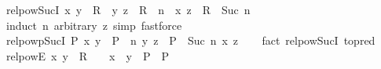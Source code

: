 \begin{isabellebody}
\endisatagproof
{\isafoldproof}%
%
\isadelimproof
\isanewline
%
\endisadelimproof
\isanewline
{}\isamarkupfalse%
\ relpow{\isacharunderscore}{\kern0pt}Suc{\isacharunderscore}{\kern0pt}I{}{\isacharcolon}{\kern0pt}\ {\isachardoublequoteopen}{\isacharparenleft}{\kern0pt}x{\isacharcomma}{\kern0pt}\ y{\isacharparenright}{\kern0pt}\ {\isasymin}\ R\ {\isasymLongrightarrow}\ {\isacharparenleft}{\kern0pt}y{\isacharcomma}{\kern0pt}\ z{\isacharparenright}{\kern0pt}\ {\isasymin}\ R\ {\isacharcircum}{\kern0pt}{\isacharcircum}{\kern0pt}\ n\ {\isasymLongrightarrow}\ {\isacharparenleft}{\kern0pt}x{\isacharcomma}{\kern0pt}\ z{\isacharparenright}{\kern0pt}\ {\isasymin}\ R\ {\isacharcircum}{\kern0pt}{\isacharcircum}{\kern0pt}\ Suc\ n{\isachardoublequoteclose}\isanewline
%
\isadelimproof
\ \ %
\endisadelimproof
%
\isatagproof
{}\isamarkupfalse%
\ {\isacharparenleft}{\kern0pt}induct\ n\ arbitrary{\isacharcolon}{\kern0pt}\ z{\isacharparenright}{\kern0pt}\ {\isacharparenleft}{\kern0pt}simp{\isacharcomma}{\kern0pt}\ fastforce{\isacharparenright}{\kern0pt}%
\endisatagproof
{\isafoldproof}%
%
\isadelimproof
\isanewline
%
\endisadelimproof
\isanewline
{}\isamarkupfalse%
\ relpowp{\isacharunderscore}{\kern0pt}Suc{\isacharunderscore}{\kern0pt}I{}{\isacharcolon}{\kern0pt}\ {\isachardoublequoteopen}P\ x\ y\ {\isasymLongrightarrow}\ {\isacharparenleft}{\kern0pt}P\ {\isacharcircum}{\kern0pt}{\isacharcircum}{\kern0pt}\ n{\isacharparenright}{\kern0pt}\ y\ z\ {\isasymLongrightarrow}\ {\isacharparenleft}{\kern0pt}P\ {\isacharcircum}{\kern0pt}{\isacharcircum}{\kern0pt}\ Suc\ n{\isacharparenright}{\kern0pt}\ x\ z{\isachardoublequoteclose}\isanewline
%
\isadelimproof
\ \ %
\endisadelimproof
%
\isatagproof
{}\isamarkupfalse%
\ {\isacharparenleft}{\kern0pt}fact\ relpow{\isacharunderscore}{\kern0pt}Suc{\isacharunderscore}{\kern0pt}I{}\ {\isacharbrackleft}{\kern0pt}to{\isacharunderscore}{\kern0pt}pred{\isacharbrackright}{\kern0pt}{\isacharparenright}{\kern0pt}%
\endisatagproof
{\isafoldproof}%
%
\isadelimproof
\isanewline
%
\endisadelimproof
\isanewline
{}\isamarkupfalse%
\ relpow{\isacharunderscore}{\kern0pt}{}{\isacharunderscore}{\kern0pt}E{\isacharcolon}{\kern0pt}\ {\isachardoublequoteopen}{\isacharparenleft}{\kern0pt}x{\isacharcomma}{\kern0pt}\ y{\isacharparenright}{\kern0pt}\ {\isasymin}\ R\ {\isacharcircum}{\kern0pt}{\isacharcircum}{\kern0pt}\ {}\ {\isasymLongrightarrow}\ {\isacharparenleft}{\kern0pt}x\ {\isacharequal}{\kern0pt}\ y\ {\isasymLongrightarrow}\ P{\isacharparenright}{\kern0pt}\ {\isasymLongrightarrow}\ P{\isachardoublequoteclose}\isanewline

\end{isabellebody}
